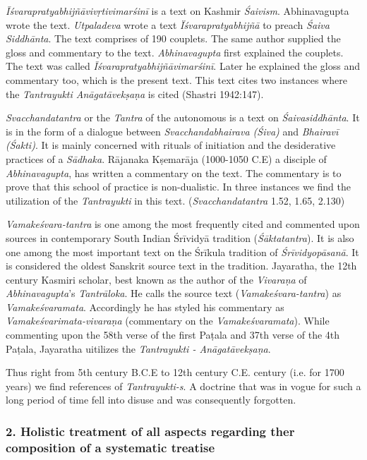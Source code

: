 \textit{Īśvarapratyabhijñāvivṛtivimarśinī} is a text on Kashmir \textit{Śaivism}. Abhinavagupta wrote the text. \textit{Utpaladeva} wrote a text \textit{Ïśvarapratyabhijñā} to preach \textit{Śaiva Siddhānta}. The text comprises of 190 couplets. The same author supplied the gloss and commentary to the text. \textit{Abhinavagupta} first explained the couplets. The text was called \textit{Īśvarapratyabhijñāvimarśinī}. Later he explained the gloss and commentary too, which is the present text. This text cites two instances where the \textit{Tantrayukti Anāgatāvekṣaṇa} is cited (Shastri 1942:147).

\textit{Svacchandatantra} or the \textit{Tantra} of the autonomous is a text on \textit{Śaivasiddhānta}. It is in the form of a dialogue between \textit{Svacchandabhairava (Śiva)} and \textit{Bhairavī (Śakti)}. It is mainly concerned with rituals of initiation and the desiderative practices of a \textit{Sādhaka}. Rājanaka Kṣemarāja (1000-1050 C.E) a disciple of \textit{Abhinavagupta}, has written a commentary on the text. The commentary is to prove that this school of practice is non-dualistic. In three instances we find the utilization of the \textit{Tantrayukti} in this text. (\textit{Svacchandatantra} 1.52, 1.65, 2.130)

\textit{Vamakeśvara-tantra} is one among the most frequently cited and commented upon sources in contemporary South Indian Śrīvidyā tradition (\textit{Śāktatantra}). It is also one among the most important text on the Śrīkula tradition of \textit{Śrīvidyopāsanā}. It is considered the oldest Sanskrit source text in the tradition. Jayaratha, the 12th century Kasmiri scholar, best known as the author of the \textit{Vivaraṇa} of \textit{Abhinavagupta}’s \textit{Tantrāloka}. He calls the source text (\textit{Vamakeśvara-tantra}) as \textit{Vamakeśvaramata}. Accordingly he has styled his commentary as \textit{Vamakeśvarimata-vivaraṇa} (commentary on the \textit{Vamakeśvaramata}). While commenting upon the 58th verse of the first Paṭala and 37th verse of the 4th Paṭala, Jayaratha uitilizes the \textit{Tantrayukti - Anāgatāvekṣaṇa}.

Thus right from 5th century B.C.E to 12th century C.E. century (i.e. for 1700 years) we find references of \textit{Tantrayukti-s}. A doctrine that was in vogue for such a long period of time fell into disuse and was consequently forgotten.


\subsubsection*{2. Holistic treatment of all aspects regarding ther composition of a systematic treatise}

